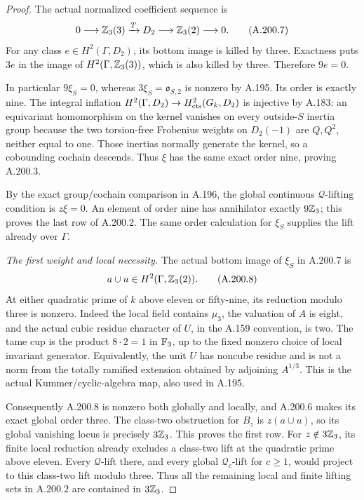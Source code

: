 \begin{proof}
The actual normalized coefficient sequence is
\[
 0\longrightarrow\mathbb Z_3(3)\xrightarrow{T}D_2
       \longrightarrow\mathbb Z_3(2)\longrightarrow0.
\tag{A.200.7}
\]
For any class \(e\in H^2(\Gamma,D_2)\), its bottom
image is killed by three.  Exactness puts \(3e\) in
the image of \(H^2(\Gamma,\mathbb Z_3(3))\), which is also
killed by three.  Therefore \(9e=0\).

In particular \(9\xi_S=0\), whereas
\(3\xi_S=\mathfrak o_{S,2}\) is nonzero by A.195.
Its order is exactly nine.  The integral inflation
\(H^2(\Gamma,D_2)\to H^2_{\rm cts}(G_k,D_2)\)
is injective by A.183: an equivariant homomorphism
on the kernel vanishes on every outside-\(S\) inertia
group because the two torsion-free Frobenius weights
on \(D_2(-1)\) are \(Q,Q^2\), neither equal to one.
Those inertias normally generate the kernel, so a
cobounding cochain descends.  Thus \(\xi\) has the
same exact order nine, proving A.200.3.

By the exact group/cochain comparison in A.196,
the global continuous \(\mathcal Q\)-lifting condition
is \(z\xi=0\).  An element of order nine has
annihilator exactly \(9\mathbb Z_3\); this proves the last
row of A.200.2.  The same order calculation for
\(\xi_S\) supplies the lift already over \(\Gamma\).

\emph{The first weight and local necessity.}
The actual bottom image of \(\xi_S\) in A.200.7 is
\[
             a\cup u\in H^2(\Gamma,\mathbb Z_3(2)).
\tag{A.200.8}
\]
At either quadratic prime of \(k\) above eleven or
fifty-nine, its reduction modulo three is nonzero.
Indeed the local field contains \(\mu_3\), the
valuation of \(A\) is eight, and the actual cubic
residue character of \(U\), in the A.159 convention,
is two.  The tame cup is the product \(8\cdot2=1\)
in \(\mathbb F_3\), up to the fixed nonzero choice of local
invariant generator.  Equivalently, the unit \(U\)
has noncube residue and is not a norm from the
totally ramified extension obtained by adjoining
\(A^{1/3}\).  This is the actual Kummer/cyclic-algebra
map, also used in A.195.

Consequently A.200.8 is nonzero both globally and
locally, and A.200.6 makes its exact global order
three.  The class-two obstruction for \(B_z\) is
\(z(a\cup u)\), so its global vanishing locus is
precisely \(3\mathbb Z_3\).  This proves the first row.
For \(z\notin3\mathbb Z_3\), its finite local reduction
already excludes a class-two lift at the quadratic
prime above eleven.  Every \(\mathcal Q\)-lift there,
and every global \(\mathcal Q_c\)-lift for \(c\ge1\),
would project to this class-two lift modulo three.
Thus all the remaining local and finite lifting
sets in A.200.2 are contained in \(3\mathbb Z_3\).


\end{proof}
